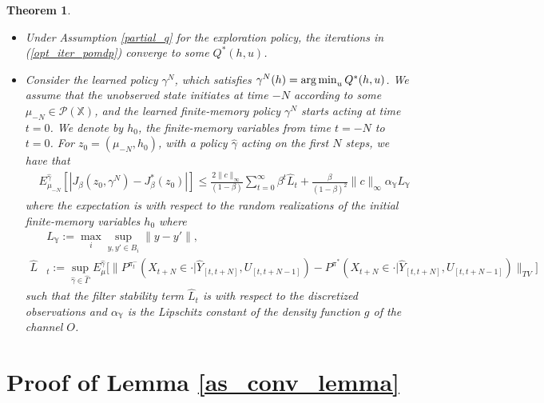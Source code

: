 \documentclass[11pt]{article}
\newtheorem{theorem}{Theorem}
\def\argmin{\mathop{\rm arg\, min}}
\def\P{{\mathcal P}}
\begin{document}
\begin{theorem}
\begin{itemize}
\item
Under Assumption \ref{partial_q} for the exploration policy,  the iterations in (\ref{opt_iter_pomdp}) converge to some $Q^*(h,u)$.
\item
Consider the learned policy $\gamma^N$, which satisfies $\gamma^N(h)=\argmin_u Q^*(h,u)$. We assume that the unobserved state initiates at time $-N$ according to some $\mu_{-N}\in \P(\mathds{X})$, and the learned finite-memory policy $\gamma^N$ starts acting at time $t=0$. We denote by $h_0$, the finite-memory variables from time $t=-N$ to $t=0$. For ${z}_0=(\mu_{-N},h_0)$, with a policy $\hat{\gamma}$ acting on the first $N$ steps, we have that
\begin{align*}
&E_{\mu_{-N}}^{\hat{\gamma}}\left[\left|J_\beta({z}_0,{\gamma^N}) - J_\beta^*(z_0)\right|\right]\leq  \frac{2\|c\|_\infty }{(1-\beta)}\sum_{t=0}^\infty\beta^t\hat{L}_t + \frac{\beta}{(1-\beta)^2}\|c\|_\infty \alpha_{\mathds{Y}} L_\mathds{Y} \end{align*}
 where the expectation is with respect to the random realizations of the initial finite-memory variables $h_0$
where
\begin{align*}
 &L_{\mathds{Y}}:= \max_{i}\sup_{y,y'\in B_i}\|y-y'\|,\\
\hat{L}&_t:=\sup_{\hat{\gamma}\in\hat{\Gamma}}E_{\mu}^{\hat{\gamma}}\bigg[\|P^{\pi_t^-}(X_{t+N}\in\cdot|\hat{Y}_{[t,t+N]},U_{[t,t+N-1]})-P^{\pi^*}(X_{t+N}\in\cdot|\hat{Y}_{[t,t+N]},U_{[t,t+N-1]})\|_{TV}\bigg]
\end{align*}
such that the filter stability term $\hat{L}_t$ is with respect to the discretized observations and $\alpha_{\mathds{Y}}$ is the Lipschitz constant of the density function $g$ of the channel $O$.
\end{itemize}
\end{theorem}




\newpage

\appendix

\section{Proof of Lemma \ref{as_conv_lemma}}\label{as_conv_lemma_proof}
\end{document}
